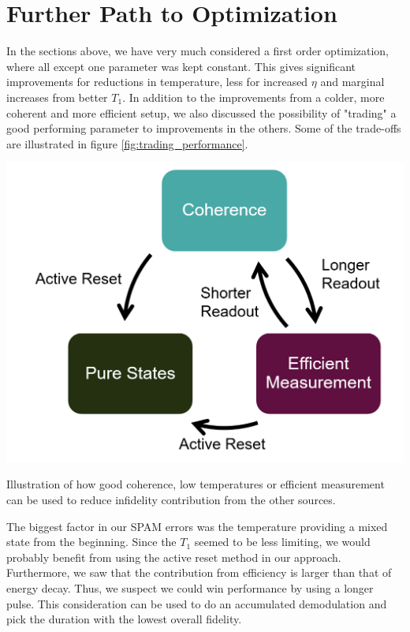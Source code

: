 \section{Further Path to Optimization}
In the sections above, we have very much considered a first order optimization, where all except one parameter was kept constant. This gives significant improvements for reductions in temperature, less for increased $\eta$ and marginal increases from better $T_1$. In addition to the improvements from a colder, more coherent and more efficient setup, we also discussed the possibility of "trading" a good performing parameter to improvements in the others. Some of the trade-offs are illustrated in figure \ref{fig:trading_performance}. 

\begin{marginfigure}
    \centering
    \includegraphics[]{Figs/trading_parameters.png}
    \caption{Illustration of how good coherence, low temperatures or efficient measurement can be used to reduce infidelity contribution from the other sources. }
    \label{fig:trading_performance}
\end{marginfigure}

The biggest factor in our SPAM errors was the temperature providing a mixed state from the beginning. Since the $T_1$ seemed to be less limiting, we would probably benefit from using the active reset method in our approach. Furthermore, we saw that the contribution from efficiency is larger than that of energy decay. Thus, we suspect we could win performance by using a longer pulse. This consideration can be used to do an accumulated demodulation and pick the duration with the lowest overall fidelity.

